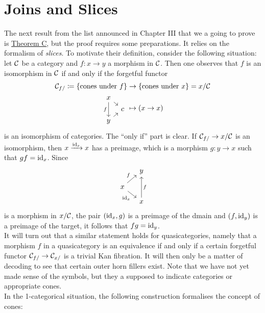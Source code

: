 \section{Joins and Slices}\label{chVI-3}
    The next result from the list announced in Chapter III that we a going to prove is \hyperref[chIII-thm-c]{Theorem C}, but the proof requires some preparations. It relies on the formalism of \emph{slices}. To motivate their definition, consider the following situation: let $\mathcal{C}$ be a category and $f \colon x \to y$ a morphism in $\mathcal{C}$. Then one observes that $f$ is an isomorphism in $\mathcal{C}$ if and only if the forgetful functor
    \begin{align*}
        \Cc_{f/} \coloneq \{ \text{cones under } f \} &\to \{ \text{cones under } x \} = x / \Cc \\
        \begin{tikzcd}[sep=tiny,ampersand replacement=\&]
            x \arrow[dd, "f"'] \arrow[dr] \& \\
            \& c \\
            y \arrow[ur] \&
        \end{tikzcd}
        &\mapsto (x \to x)
    \end{align*}
    is an isomorphism of categories. The ``only if'' part is clear. If $\mathcal{C}_{f/} \to x / \mathcal{C}$ is an isomorphism, then $x \xrightarrow{\operatorname{id}_x} x$ has a preimage, which is a morphism $g \colon y \to x$ such that $gf = \operatorname{id}_x$. Since
    \begin{equation*}
        \begin{tikzcd}[sep=small]
            & y \\
            x \arrow[ur, "f"] \arrow[dr, "\id_x"'] \\
            & x \arrow[uu, "f"']
        \end{tikzcd}
    \end{equation*}
    is a morphism in $x / \mathcal{C}$, the pair $(\operatorname{id}_x, g)$ is a preimage of the dmain and $(f, \operatorname{id}_y)$ is a preimage of the target, it follows that $fg = \operatorname{id}_y$.\\
    It will turn out that a similar statement holds for quasicategories, namely that a morphism $f$ in a quasicategory is an equivalence if and only if a certain forgetful functor $\mathcal{C}_{f/} \to \mathcal{C}_{x/}$ is a trivial Kan fibration. It will then only be a matter of decoding to see that certain outer horn fillers exist. Note that we have not yet made sense of the symbols, but they a supposed to indicate categories or appropriate cones.\\
    In the 1-categorical situation, the following construction formalises the concept of cones:

